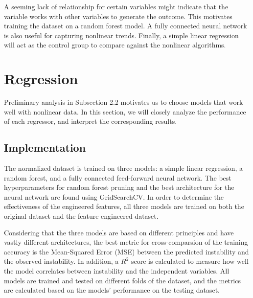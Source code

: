 \documentclass[twocolumn]{article}
\begin{document}
A seeming lack of relationship for certain variables might indicate that the variable works with other variables to generate the outcome. This motivates training the dataset on a random forest model. A fully connected neural network is also useful for capturing nonlinear trends. Finally, a simple linear regression will act as the control group to compare against the nonlinear algorithms.

\section{Regression}
Preliminary analysis in Subsection 2.2 motivates us to choose models that work well with nonlinear data. In this section, we will closely analyze the performance of each regressor, and interpret the corresponding results.
\subsection{Implementation}
The normalized dataset is trained on three models: a simple linear regression, a random forest, and a fully connected feed-forward neural network. The best hyperparameters for random forest pruning and the best architecture for the neural network are found using GridSearchCV. In order to determine the effectiveness of the engineered features, all three models are trained on both the original dataset and the feature engineered dataset.

Considering that the three models are based on different principles and have vastly different architectures, the best metric for cross-comparsion of the training accuracy is the Mean-Squared Error (MSE) between the predicted instability and the observed instability. In addition, a $R^2$ score is calculated to measure how well the model correlates between instability and the independent variables. All models are trained and tested on different folds of the dataset, and the metrics are calculated based on the models' performance on the testing dataset.
\end{document}
